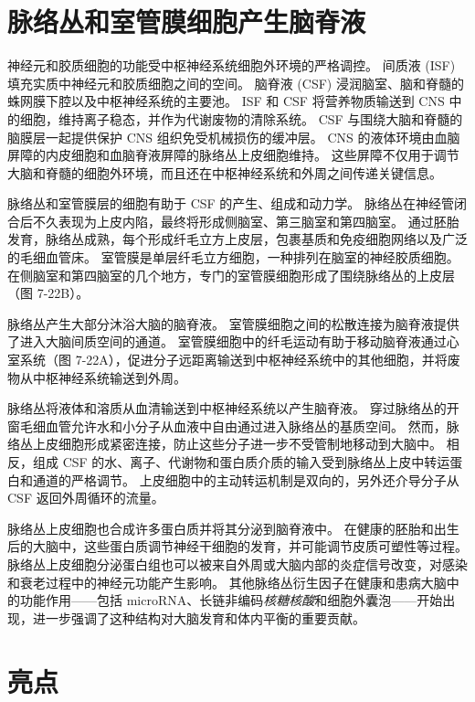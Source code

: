 \section{脉络丛和室管膜细胞产生脑脊液}

神经元和胶质细胞的功能受中枢神经系统细胞外环境的严格调控。
间质液 (ISF) 填充实质中神经元和胶质细胞之间的空间。
脑脊液 (CSF) 浸润脑室、脑和脊髓的蛛网膜下腔以及中枢神经系统的主要池。
ISF 和 CSF 将营养物质输送到 CNS 中的细胞，维持离子稳态，并作为代谢废物的清除系统。
CSF 与围绕大脑和脊髓的脑膜层一起提供保护 CNS 组织免受机械损伤的缓冲层。
CNS 的液体环境由血脑屏障的内皮细胞和血脑脊液屏障的脉络丛上皮细胞维持。
这些屏障不仅用于调节大脑和脊髓的细胞外环境，而且还在中枢神经系统和外周之间传递关键信息。


脉络丛和室管膜层的细胞有助于 CSF 的产生、组成和动力学。
脉络丛在神经管闭合后不久表现为上皮内陷，最终将形成侧脑室、第三脑室和第四脑室。
通过胚胎发育，脉络丛成熟，每个形成纤毛立方上皮层，包裹基质和免疫细胞网络以及广泛的毛细血管床。
室管膜是单层纤毛立方细胞，一种排列在脑室的神经胶质细胞。
在侧脑室和第四脑室的几个地方，专门的室管膜细胞形成了围绕脉络丛的上皮层（图 7-22B）。


脉络丛产生大部分沐浴大脑的脑脊液。
室管膜细胞之间的松散连接为脑脊液提供了进入大脑间质空间的通道。
室管膜细胞中的纤毛运动有助于移动脑脊液通过心室系统（图 7-22A），促进分子远距离输送到中枢神经系统中的其他细胞，并将废物从中枢神经系统输送到外周。


脉络丛将液体和溶质从血清输送到中枢神经系统以产生脑脊液。
穿过脉络丛的开窗毛细血管允许水和小分子从血液中自由通过进入脉络丛的基质空间。
然而，脉络丛上皮细胞形成紧密连接，防止这些分子进一步不受管制地移动到大脑中。
相反，组成 CSF 的水、离子、代谢物和蛋白质介质的输入受到脉络丛上皮中转运蛋白和通道的严格调节。
上皮细胞中的主动转运机制是双向的，另外还介导分子从 CSF 返回外周循环的流量。


脉络丛上皮细胞也合成许多蛋白质并将其分泌到脑脊液中。
在健康的胚胎和出生后的大脑中，这些蛋白质调节神经干细胞的发育，并可能调节皮质可塑性等过程。
脉络丛上皮细胞分泌蛋白组也可以被来自外周或大脑内部的炎症信号改变，对感染和衰老过程中的神经元功能产生影响。
其他脉络丛衍生因子在健康和患病大脑中的功能作用——包括 microRNA、长链非编码\textit{核糖核酸}和细胞外囊泡——开始出现，进一步强调了这种结构对大脑发育和体内平衡的重要贡献。



\section{亮点}

